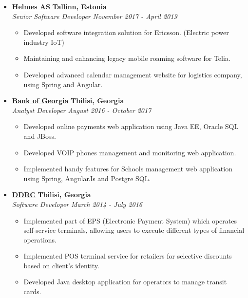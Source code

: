 \documentclass[10pt,letterpaper]{article}
\begin{document}
\begin{itemize}
    \item[]
    {\href{https://www.helmes.com/}{\textbf{Helmes AS}} \hfill
      \textbf{Tallinn, Estonia}}
    \\
    {\emph{Senior Software Developer} \hfill \emph{November 2017 - April 2019}}

    \begin{itemize}[label=\textbullet]
      \itemsep0em
      \item Developed software integration solution for Ericsson. (Electric power industry IoT)
      \item Maintaining and enhancing legacy mobile roaming software for Telia.
      \item Developed advanced calendar management website for logistics company, using Spring and Angular.
      
    \end{itemize}
    \hfill \break
    
    \item[]
    {\href{http://bankofgeorgia.ge/en/}{\textbf{Bank of Georgia}} \hfill
      \textbf{Tbilisi, Georgia}}
    \\
    {\emph{Analyst Developer} \hfill \emph{August 2016 - October 2017}}

    \begin{itemize}[label=\textbullet]
      \itemsep0em
      \item Developed online payments web application using Java EE, Oracle SQL and JBoss.
      \item Developed VOIP phones management and monitoring web application.
      \item Implemented handy features for Schools management web application using Spring, AngularJs and Postgre SQL.
      
    \end{itemize}
    \hfill \break

    \item[]
    {\href{https://www.linkedin.com/company/ddrc-didi-digomi-research-center}{\textbf{DDRC}}
\hfill
      \textbf{Tbilisi, Georgia}}
    \\
    {\emph{Software Developer} \hfill \emph{March 2014 - July 2016}}

    \begin{itemize}[label=\textbullet]
      \itemsep0em
      \item Implemented part of EPS (Electronic Payment System) which operates self-service terminals,
allowing users to execute different types of financial operations.
      \item Implemented POS terminal service for retailers for selective discounts based on client's identity.
      \item Developed Java desktop application for operators to manage transit cards.
      

\end{itemize}
\end{itemize}
\end{document}

